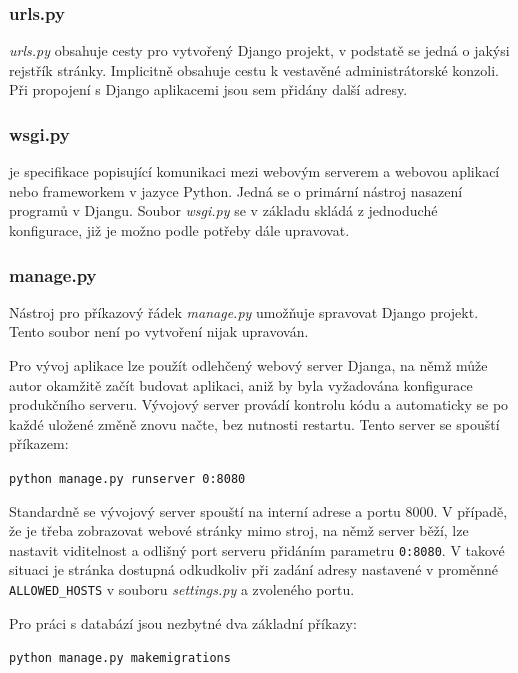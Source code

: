 \subsubsection{urls.py}
\textit{urls.py} obsahuje  cesty pro vytvořený Django projekt, v podstatě se jedná o jakýsi rejstřík stránky. Implicitně obsahuje cestu k vestavěné administrátorské konzoli. Při propojení s Django aplikacemi jsou sem přidány další  adresy.

\subsubsection{wsgi.py}
 je specifikace popisující komunikaci mezi webovým serverem a webovou aplikací nebo frameworkem v jazyce Python. Jedná se o primární nástroj nasazení programů v Djangu. Soubor \textit{wsgi.py} se v základu skládá z jednoduché  konfigurace, již je možno podle potřeby dále upravovat.

\subsubsection{manage.py}
Nástroj pro příkazový řádek \textit{manage.py} umožňuje spravovat Django projekt. Tento soubor není po vytvoření nijak upravován.

Pro vývoj aplikace lze použít odlehčený webový server Djanga, na němž může autor okamžitě začít budovat aplikaci, aniž by byla vyžadována konfigurace produkčního serveru. Vývojový server provádí kontrolu kódu a automaticky se po každé uložené změně znovu načte, bez nutnosti restartu. Tento server se spouští příkazem:

\begin{center}
\texttt{python manage.py runserver 0:8080}
\end{center}

Standardně se vývojový server spouští na interní  adrese a portu 8000. V případě, že je třeba zobrazovat webové stránky mimo stroj, na němž server běží, lze nastavit viditelnost a odlišný port serveru přidáním parametru \texttt{0:8080}. V takové situaci je stránka dostupná odkudkoliv při zadání adresy nastavené v proměnné \texttt{ALLOWED\_HOSTS} v souboru \textit{settings.py} a zvoleného portu.

Pro práci s databází jsou nezbytné dva základní příkazy:

\begin{center}
\texttt{python manage.py makemigrations}
\end{center}

